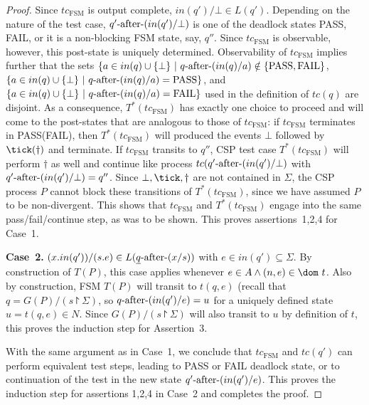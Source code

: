 \begin{proof}
Since $tc_\text{FSM}$ is output complete,
$in(q')/\bot \in L(q')$. Depending on the nature of the test case, 
$q'\text{-after-} (in(q')/\bot)$ is one of the deadlock states PASS, FAIL, or it is a
non-blocking FSM state, say, $q''$. Since $tc_\text{FSM}$ is observable, however, 
this post-state is uniquely determined. Observability of $tc_\text{FSM}$ 
implies further that the sets $\{ a\in in(q)\cup\{\bot\}~|~q\text{-after-}(in(q)/a)\notin \{\text{PASS},\text{FAIL}\}$, $\{ a\in in(q)\cup\{\bot\}~|~q\text{-after-}(in(q)/a) = \text{PASS} \}$, and $\{ a\in in(q)\cup\{\bot\}~|~q\text{-after-}(in(q)/a) = \text{FAIL} \}$
used in the definition of $tc(q)$ are disjoint. As a consequence, $T^*(tc_\text{FSM})$
has exactly one choice to proceed and will come to the post-states that are analogous to those of $tc_\text{FSM}$: if $tc_\text{FSM}$ terminates in PASS(FAIL), then 
$T^*(tc_\text{FSM})$ will produced the events $\bot$ followed by 
$\tick(\dag)$ and terminate. If $tc_\text{FSM}$  transits to $q''$, CSP test case
$T^*(tc_\text{FSM})$ will perform $\dag$ as well and continue like process 
$tc(q'\text{-after-}(in(q')/\bot)$ with $q'\text{-after-}(in(q')/\bot) = q''$. 
Since $\bot,\tick,\dag$ are not contained in $\Sigma$, the CSP process $P$ 
cannot block these transitions of  $T^*(tc_\text{FSM})$, since we have assumed $P$ to be non-divergent. This shows that $tc_\text{FSM}$ and $T^*(tc_\text{FSM})$ engage into the same pass/fail/continue step, as was to be shown. This proves assertions~1,2,4 
for Case~1.



 
\medskip
\noindent
{\bf Case~2.} $(x.in(q'))/(s.e) \in L(\underline{q}\text{-after-} (x/s))$ with $e\in in(q')\subseteq\Sigma$.\newline
By construction of $T(P)$, this case applies whenever $e\in A\wedge (n,e)\in\dom~t$.
Also by construction, FSM $T(P)$ will transit to $t(q,e)$ (recall that
$q = G(P)/(s\project \Sigma)$, so
$q\text{-after-}(in(q')/e) = u$ for a uniquely defined state $u= t(q,e) \in N$. Since 
$G(P)/(s\project \Sigma)$ will also transit to $u$ by definition of $t$, this proves the induction step for Assertion~3.

With the same argument as in Case~1, we conclude that $tc_\text{FSM}$ and
$tc(q')$ can perform equivalent test steps, leading to PASS or FAIL deadlock state,
or to continuation of the test in the new state $q'\text{-after-}(in(q')/e)$.
This proves the induction step for assertions 1,2,4 in Case~2 and completes the proof.
\xbox
\end{proof}























